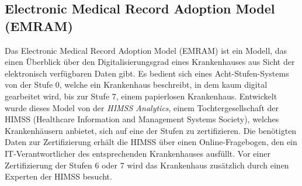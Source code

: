 \subsection{Electronic Medical Record Adoption Model (EMRAM)}
\label{sec:EMRAM}
	Das Electronic Medical Record Adoption Model (EMRAM) ist ein Modell, das einen Überblick über den Digitalisierungsgrad eines Krankenhauses aus Sicht der elektronisch verfügbaren Daten gibt. Es bedient sich eines Acht-Stufen-Systems von der Stufe 0, welche ein Krankenhaus beschreibt, in dem kaum digital gearbeitet wird, bis zur Stufe 7, einem papierlosen Krankenhaus. Entwickelt wurde dieses Model von der \textit{HIMSS Analytics}, einem Tochtergesellschaft der HIMSS (Healthcare Information and Management Systems Society), welches Krankenhäusern anbietet, sich auf eine der Stufen zu zertifizieren. Die benötigten Daten zur Zertifizierung erhält die HIMSS über einen Online-Fragebogen, den ein IT-Verantwortlicher des entsprechenden Krankenhauses ausfüllt. Vor einer Zertifizierung der Stufen 6 oder 7 wird das Krankenhaus zusätzlich durch einen Experten der HIMSS besucht. \parencite{Stephani2019}
